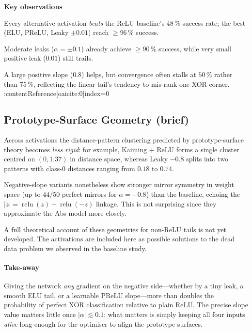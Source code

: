 \textbf{Key observations}
\begin{enumerate*}[label=(\alph*)]
  \item Every alternative activation \emph{beats} the ReLU
        baseline's $48\,\%$ success rate;
        the best (ELU, PReLU, Leaky $\pm0.01$) reach $\ge96\,\%$
        success.%
        
  \item Moderate leaks ($\alpha=\pm0.1$) already achieve $\ge90\,\%$
        success, while very small positive leak ($0.01$) still trails.%
        
  \item A large positive slope ($0.8$) helps, but convergence often
        stalls at $50\,\%$ rather than $75\,\%$, reflecting the linear
        tail's tendency to mis-rank one XOR corner.%
        :contentReference[oaicite:0]{index=0}
\end{enumerate*}

\subsection*{Prototype-Surface Geometry (brief)}
Across activations the distance-pattern clustering predicted by
prototype-surface theory becomes \emph{less rigid}:  
for example, Kaiming + ReLU forms a single cluster centred on
$(0,1.37)$ in distance space, whereas Leaky $-0.8$ splits into two
patterns with class-$0$ distances ranging from $0.18$ to $0.74$.%

Negative-slope variants nonetheless show stronger mirror symmetry in
weight space (up to $44/50$ perfect mirrors for $\alpha=-0.8$) than the
baseline, echoing the
$|z|=\operatorname{relu}(z)+\operatorname{relu}(-z)$ linkage. 
This is not surprising since they approximate the Abs model more closely.

A full theoretical account of these geometries for non-ReLU tails is not
yet developed. The activations are included here as possible solutions to 
the dead data problem we observed in the baseline study.

\paragraph{Take-away}
Giving the network \emph{any} gradient on the negative side—whether by a
tiny leak, a smooth ELU tail, or a learnable PReLU slope—more than
doubles the probability of perfect XOR classification relative to plain
ReLU.  The precise slope value matters little once \(|\alpha|\lesssim0.1\);
what matters is simply keeping all four inputs \emph{alive} long enough
for the optimiser to align the prototype surfaces.

\hrulefill
